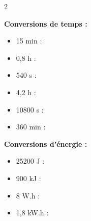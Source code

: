 \documentclass[11pt,a4paper]{article}
\begin{document}
\begin{multicols}{2}

\textbf{\large Conversions de temps :}
\vspace{3mm}

\begin{itemize}[leftmargin=1em]
    \item 15 min : \dotfill
    
    \item 0,8 h : \dotfill
    
\end{itemize}
\vspace{3mm}

\begin{itemize}[leftmargin=1em]
    \item 540 s : \dotfill
    
    \item 4,2 h : \dotfill
    
\end{itemize}
\vspace{3mm}

\begin{itemize}[leftmargin=1em]
    \item 10800 s : \dotfill
    
    \item 360 min : \dotfill
    
\end{itemize}

\columnbreak

\textbf{\large Conversions d'énergie :}
\vspace{3mm}

\begin{itemize}[leftmargin=1em]
    \item 25200 J : \dotfill
    
    \item 900 kJ : \dotfill
    
\end{itemize}

\vspace{10mm}

\begin{itemize}[leftmargin=1em]
    \item 8 W.h : \dotfill
    
    \item 1,8 kW.h : \dotfill
    
\end{itemize}

\end{multicols}


\vfill 
\end{document}
